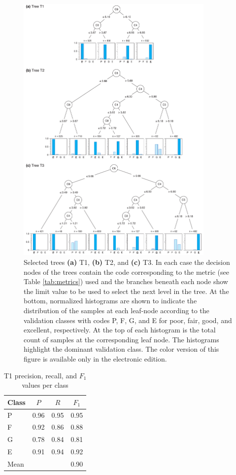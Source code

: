 \begin{figure}
	\centering
	\includegraphics[width=0.86\textwidth]{figures/pdf/figure-09}
	\caption{Selected trees \textbf{(a)} T1, \textbf{(b)} T2, and \textbf{(c)} T3. In each case the decision nodes of the trees contain the code corresponding to the metric (see Table \ref{tab:metrics}) used and the branches beneath each node show the limit value to be used to select the next level in the tree. At the bottom, normalized histograms are shown to indicate the distribution of the samples at each leaf-node according to the validation classes with codes P, F, G, and E for poor, fair, good, and excellent, respectively. At the top of each histogram is the total count of samples at the corresponding leaf node. The histograms highlight the dominant validation class. The color version of this figure is available only in the electronic edition.}
	\label{fig:trees}
\end{figure}

\begin{table}[t]
	\centering
	\caption{T1 precision, recall, and $F_1$ values per class}
	\label{tab:t1:f1}
	\small
	\begin{tabular}{lccc}
	Class   & $P$	& $R$  	& $F_1$ \\ 
	\hline
	P 		& 0.96 	& 0.95 	& 0.95 	\\
	F 		& 0.92 	& 0.86 	& 0.88 	\\
	G 		& 0.78 	& 0.84 	& 0.81 	\\
	E 		& 0.91 	& 0.94 	& 0.92 	\\
	\hline
	Mean 	&		&		& 0.90	\\
	\end{tabular}
\end{table}

